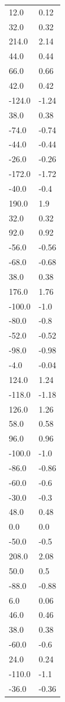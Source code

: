 \begin{longtable}{ll}
12.0 & 0.12 \\
32.0 & 0.32 \\
214.0 & 2.14 \\
44.0 & 0.44 \\
66.0 & 0.66 \\
42.0 & 0.42 \\
-124.0 & -1.24 \\
38.0 & 0.38 \\
-74.0 & -0.74 \\
-44.0 & -0.44 \\
-26.0 & -0.26 \\
-172.0 & -1.72 \\
-40.0 & -0.4 \\
190.0 & 1.9 \\
32.0 & 0.32 \\
92.0 & 0.92 \\
-56.0 & -0.56 \\
-68.0 & -0.68 \\
38.0 & 0.38 \\
176.0 & 1.76 \\
-100.0 & -1.0 \\
-80.0 & -0.8 \\
-52.0 & -0.52 \\
-98.0 & -0.98 \\
-4.0 & -0.04 \\
124.0 & 1.24 \\
-118.0 & -1.18 \\
126.0 & 1.26 \\
58.0 & 0.58 \\
96.0 & 0.96 \\
-100.0 & -1.0 \\
-86.0 & -0.86 \\
-60.0 & -0.6 \\
-30.0 & -0.3 \\
48.0 & 0.48 \\
0.0 & 0.0 \\
-50.0 & -0.5 \\
208.0 & 2.08 \\
50.0 & 0.5 \\
-88.0 & -0.88 \\
6.0 & 0.06 \\
46.0 & 0.46 \\
38.0 & 0.38 \\
-60.0 & -0.6 \\
24.0 & 0.24 \\
-110.0 & -1.1 \\
-36.0 & -0.36 \\

\end{longtable}
